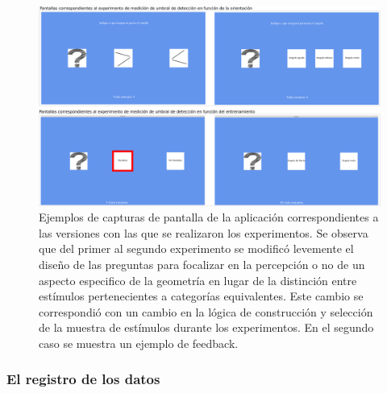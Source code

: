 \documentclass{article}
\numberwithin{figure}{section}
\begin{document}
    \begin{figure}
        \center
        \includegraphics[width=\textwidth]{Imagenes/Pantallas2.png}
        \caption{Ejemplos de  capturas de pantalla de la aplicación correspondientes a las versiones con las que se realizaron los experimentos. Se observa que del primer al segundo experimento se modificó levemente el diseño de las preguntas para focalizar en la percepción o no de un aspecto especifico de la geometría en lugar de la distinción entre estímulos pertenecientes a categorías equivalentes. Este cambio se correspondió con un cambio en la lógica de construcción y selección de la muestra de estímulos durante los experimentos. En el segundo caso se muestra un ejemplo de feedback.}
        
        \label{fig:Pantallas2}
    \end{figure}
    
    \subsubsection{El registro de los datos}
    
\end{document}

